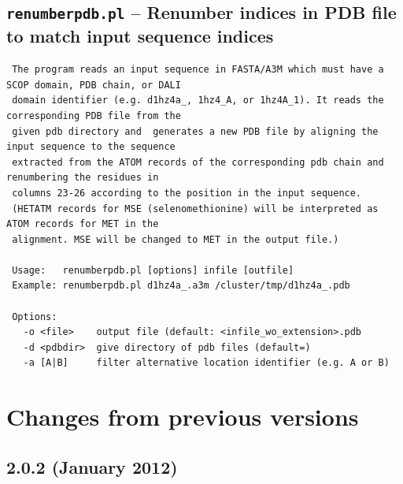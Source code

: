 \documentclass[11pt,a4paper]{article}
\begin{document}
\subsection{{\tt renumberpdb.pl} -- Renumber indices in PDB file to match input sequence indices}

\small 
\begin{verbatim}
 The program reads an input sequence in FASTA/A3M which must have a SCOP domain, PDB chain, or DALI 
 domain identifier (e.g. d1hz4a_, 1hz4_A, or 1hz4A_1). It reads the corresponding PDB file from the 
 given pdb directory and  generates a new PDB file by aligning the input sequence to the sequence 
 extracted from the ATOM records of the corresponding pdb chain and renumbering the residues in 
 columns 23-26 according to the position in the input sequence.
 (HETATM records for MSE (selenomethionine) will be interpreted as ATOM records for MET in the 
 alignment. MSE will be changed to MET in the output file.)
 
 Usage:   renumberpdb.pl [options] infile [outfile] 
 Example: renumberpdb.pl d1hz4a_.a3m /cluster/tmp/d1hz4a_.pdb 

 Options: 
   -o <file>    output file (default: <infile_wo_extension>.pdb
   -d <pdbdir>  give directory of pdb files (default=)
   -a [A|B]     filter alternative location identifier (e.g. A or B)
\end{verbatim} 
\normalsize



\section{Changes from previous versions}

\subsection{2.0.2 (January 2012)}
\end{document}
